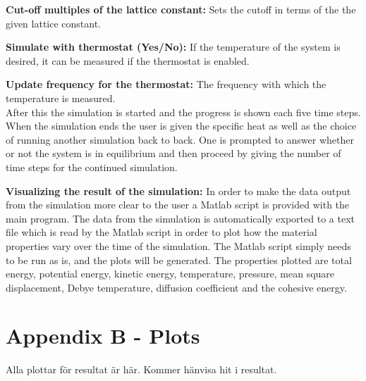\documentclass[12pt,a4paper]{article}
\begin{document}
\textbf{Cut-off multiples of the lattice constant:} Sets the cutoff in terms of the the given lattice constant.

\textbf{Simulate with thermostat (Yes/No):} If the temperature of the system is desired, it can be measured if the thermostat is enabled. 

\textbf{Update frequency for the thermostat: }The frequency with which the temperature is measured. \\
After this the simulation is started and the progress is shown each five time steps. \\
When the simulation ends the user is given the specific heat as well as the choice of running another simulation back to back. One is prompted to answer whether or not the system is in equilibrium and then proceed by giving the number of time steps for the continued simulation. 

\textbf{Visualizing the result of the simulation:} 
In order to make the data output from the simulation more clear to the user a Matlab script is provided with the main program. The data from the simulation is automatically exported to a text file which is read by the Matlab script in order to plot how the material properties vary over the time of the simulation. The Matlab script simply needs to be run as is, and the plots will be generated. The properties plotted are total energy, potential energy, kinetic energy, temperature, pressure, mean square displacement, Debye temperature, diffusion coefficient and the cohesive energy.

\newpage
\section{Appendix B - Plots}
\label{sec:AppendixB}
Alla plottar för resultat är här. Kommer hänvisa hit i resultat.
\end{document}

